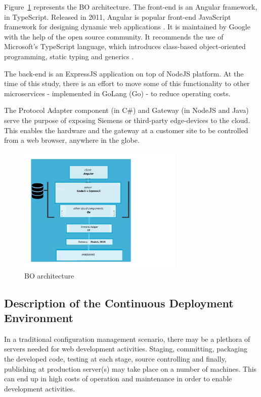 \documentclass[conference]{IEEEtran}
\begin{document}
	Figure~\ref{fig:BOIC architecture} represents the BO architecture.
	The front-end is an Angular framework, in TypeScript.
	Released in 2011, Angular is popular front-end JavaScript framework for designing dynamic web applications \cite{wiki:angular}.
	It is maintained by Google with the help of the open source community.
	It recommends the use of Microsoft's TypeScript language, which introduces class-based object-oriented programming, static typing and generics \cite{wiki:typescript}.
	
	The back-end is an ExpressJS application on top of NodeJS platform. 
	At the time of this study, there is an effort to move some of this functionality to other microservices - implemented in GoLang (Go) - to reduce operating costs.
	
	The Protocol Adapter component (in C\#) and Gateway (in NodeJS and Java) serve the purpose of exposing Siemens or third-party edge-devices to the cloud. 
	This enables the hardware and the gateway at a customer site to be controlled from a web browser, anywhere in the globe.

	\begin{figure}[!b]
			\includegraphics[width=0.70\textwidth,]{architecture.pdf}
		\caption{BO architecture}
		\label{fig:BOIC architecture}
	\end{figure}

	\subsection{Description of the Continuous Deployment Environment }
	
	
	In a traditional configuration management scenario, there may be a plethora of servers needed for web development activities.
	Staging, committing, packaging the developed code, testing at each stage, source controlling and finally, publishing at production server(s) may take place on a number of machines.
	This can end up in high costs of operation and maintenance in order to enable development activities.
	
\end{document}
